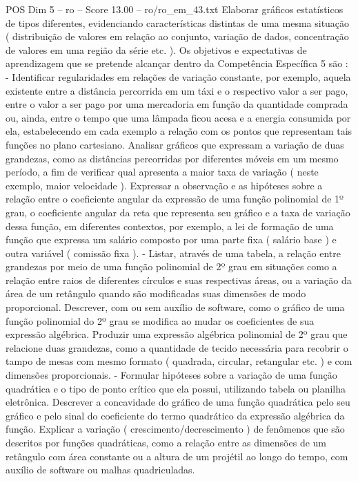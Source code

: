 \begin{textsample}{POS Dim 5 – ro – Score 13.00 – ro/ro\_em\_43.txt}
Elaborar gráficos estatísticos de tipos diferentes, evidenciando características distintas de uma mesma situação ( distribuição de valores em relação ao conjunto, variação de dados, concentração de valores em uma região da série etc. ).
Os objetivos e expectativas de aprendizagem que se pretende alcançar dentro da Competência Específica 5 são : - Identificar regularidades em relações de variação constante, por exemplo, aquela existente entre a distância percorrida em um táxi e o respectivo valor a ser pago, entre o valor a ser pago por uma mercadoria em função da quantidade comprada ou, ainda, entre o tempo que uma lâmpada ficou acesa e a energia consumida por ela, estabelecendo em cada exemplo a relação com os pontos que representam tais funções no plano cartesiano.
Analisar gráficos que expressam a variação de duas grandezas, como as distâncias percorridas por diferentes móveis em um mesmo período, a fim de verificar qual apresenta a maior taxa de variação ( neste exemplo, maior velocidade ).
Expressar a observação e as hipóteses sobre a relação entre o coeficiente angular da expressão de uma função polinomial de 1º grau, o coeficiente angular da reta que representa seu gráfico e a taxa de variação dessa função, em diferentes contextos, por exemplo, a lei de formação de uma função que expressa um salário composto por uma parte fixa ( salário base ) e outra variável ( comissão fixa ). - Listar, através de uma tabela, a relação entre grandezas por meio de uma função polinomial de 2º grau em situações como a relação entre raios de diferentes círculos e suas respectivas áreas, ou a variação da área de um retângulo quando são modificadas suas dimensões de modo proporcional.
Descrever, com ou sem auxílio de software, como o gráfico de uma função polinomial do 2º grau se modifica ao mudar os coeficientes de sua expressão algébrica.
Produzir uma expressão algébrica polinomial de 2º grau que relacione duas grandezas, como a quantidade de tecido necessária para recobrir o tampo de mesas com mesmo formato ( quadrada, circular, retangular etc. ) e com dimensões proporcionais. - Formular hipóteses sobre a variação de uma função quadrática e o tipo de ponto crítico que ela possui, utilizando tabela ou planilha eletrônica.
Descrever a concavidade do gráfico de uma função quadrática pelo seu gráfico e pelo sinal do coeficiente do termo quadrático da expressão algébrica da função.
Explicar a variação ( crescimento/decrescimento ) de fenômenos que são descritos por funções quadráticas, como a relação entre as dimensões de um retângulo com área constante ou a altura de um projétil ao longo do tempo, com auxílio de software ou malhas quadriculadas.

\end{textsample}
